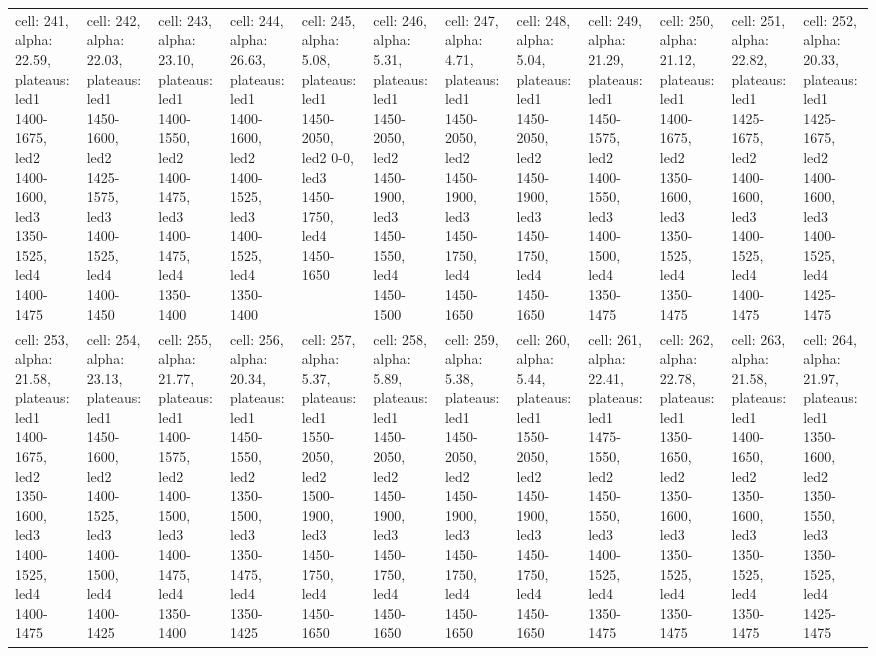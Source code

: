 \begin{landscape}
\begin{longtable}{|l|l|l|l|l|l|l|l|l|l|l|l|}
\rowcolor{lightgray} cell: 241, alpha: 22.59, plateaus: led1 1400-1675, led2 1400-1600, led3 1350-1525, led4 1400-1475 &cell: 242, alpha: 22.03, plateaus: led1 1450-1600, led2 1425-1575, led3 1400-1525, led4 1400-1450 &cell: 243, alpha: 23.10, plateaus: led1 1400-1550, led2 1400-1475, led3 1400-1475, led4 1350-1400 &cell: 244, alpha: 26.63, plateaus: led1 1400-1600, led2 1400-1525, led3 1400-1525, led4 1350-1400 &cell: 245, alpha: 5.08, plateaus: led1 1450-2050, led2 0-0, led3 1450-1750, led4 1450-1650 &cell: 246, alpha: 5.31, plateaus: led1 1450-2050, led2 1450-1900, led3 1450-1550, led4 1450-1500 &cell: 247, alpha: 4.71, plateaus: led1 1450-2050, led2 1450-1900, led3 1450-1750, led4 1450-1650 &cell: 248, alpha: 5.04, plateaus: led1 1450-2050, led2 1450-1900, led3 1450-1750, led4 1450-1650 &cell: 249, alpha: 21.29, plateaus: led1 1450-1575, led2 1400-1550, led3 1400-1500, led4 1350-1475 &cell: 250, alpha: 21.12, plateaus: led1 1400-1675, led2 1350-1600, led3 1350-1525, led4 1350-1475 &cell: 251, alpha: 22.82, plateaus: led1 1425-1675, led2 1400-1600, led3 1400-1525, led4 1400-1475 &cell: 252, alpha: 20.33, plateaus: led1 1425-1675, led2 1400-1600, led3 1400-1525, led4 1425-1475 \\
cell: 253, alpha: 21.58, plateaus: led1 1400-1675, led2 1350-1600, led3 1400-1525, led4 1400-1475 &cell: 254, alpha: 23.13, plateaus: led1 1450-1600, led2 1400-1525, led3 1400-1500, led4 1400-1425 &cell: 255, alpha: 21.77, plateaus: led1 1400-1575, led2 1400-1500, led3 1400-1475, led4 1350-1400 &cell: 256, alpha: 20.34, plateaus: led1 1450-1550, led2 1350-1500, led3 1350-1475, led4 1350-1425 &cell: 257, alpha: 5.37, plateaus: led1 1550-2050, led2 1500-1900, led3 1450-1750, led4 1450-1650 &cell: 258, alpha: 5.89, plateaus: led1 1450-2050, led2 1450-1900, led3 1450-1750, led4 1450-1650 &cell: 259, alpha: 5.38, plateaus: led1 1450-2050, led2 1450-1900, led3 1450-1750, led4 1450-1650 &cell: 260, alpha: 5.44, plateaus: led1 1550-2050, led2 1450-1900, led3 1450-1750, led4 1450-1650 &cell: 261, alpha: 22.41, plateaus: led1 1475-1550, led2 1450-1550, led3 1400-1525, led4 1350-1475 &cell: 262, alpha: 22.78, plateaus: led1 1350-1650, led2 1350-1600, led3 1350-1525, led4 1350-1475 &cell: 263, alpha: 21.58, plateaus: led1 1400-1650, led2 1350-1600, led3 1350-1525, led4 1350-1475 &cell: 264, alpha: 21.97, plateaus: led1 1350-1600, led2 1350-1550, led3 1350-1525, led4 1425-1475 \\

\end{longtable}
\end{landscape}
